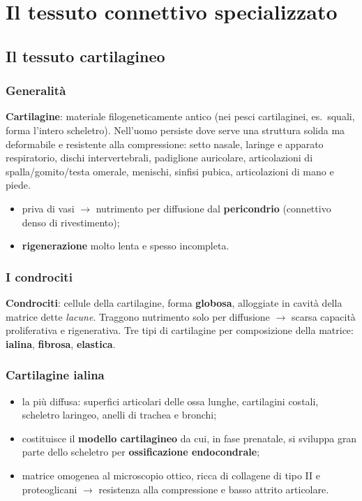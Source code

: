 \chapter{Il tessuto connettivo specializzato}

\section{Il tessuto cartilagineo}

\subsection{Generalità}
\textbf{Cartilagine}: materiale filogeneticamente antico (nei pesci cartilaginei, es.\ squali,
forma l'intero scheletro). Nell'uomo persiste dove serve una struttura solida ma deformabile e
resistente alla compressione: setto nasale, laringe e apparato respiratorio, dischi intervertebrali,
padiglione auricolare, articolazioni di spalla/gomito/testa omerale, menischi, sinfisi pubica,
articolazioni di mano e piede.
\begin{itemize}
  \item priva di vasi $\rightarrow$ nutrimento per diffusione dal \textbf{pericondrio} (connettivo
    denso di rivestimento);
  \item \textbf{rigenerazione} molto lenta e spesso incompleta.
\end{itemize}

\subsection{I condrociti}
\textbf{Condrociti}: cellule della cartilagine, forma \textbf{globosa}, alloggiate in cavità della
matrice dette \textit{lacune}. Traggono nutrimento solo per diffusione $\rightarrow$ scarsa
capacità proliferativa e rigenerativa. Tre tipi di cartilagine per composizione della matrice:
\textbf{ialina}, \textbf{fibrosa}, \textbf{elastica}.

\subsection{Cartilagine ialina}
\begin{itemize}
  \item la più diffusa: superfici articolari delle ossa lunghe, cartilagini costali, scheletro
    laringeo, anelli di trachea e bronchi;
  \item costituisce il \textbf{modello cartilagineo} da cui, in fase prenatale, si sviluppa gran
    parte dello scheletro per \textbf{ossificazione endocondrale};
  \item matrice omogenea al microscopio ottico, ricca di collagene di tipo II e proteoglicani
    $\rightarrow$ resistenza alla compressione e basso attrito articolare.
\end{itemize}


